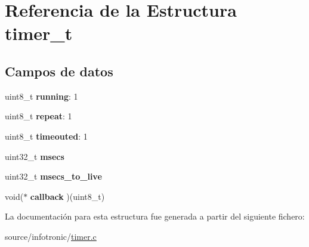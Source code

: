 \hypertarget{structtimer__t}{}\section{Referencia de la Estructura timer\+\_\+t}
\label{structtimer__t}
\subsection*{Campos de datos}
\begin{DoxyCompactItemize}
\item 
\mbox{\label{structtimer__t_a9624eaffed5cbcb6266f2207ddaac334}} 
uint8\+\_\+t {\bfseries running}\+: 1
\item 
\mbox{\label{structtimer__t_adf4cfba1c8d2514716d4f2b9090a9a88}} 
uint8\+\_\+t {\bfseries repeat}\+: 1
\item 
\mbox{\label{structtimer__t_a3235adab6714a02d8383ef9e0d5f5e6c}} 
uint8\+\_\+t {\bfseries timeouted}\+: 1
\item 
\mbox{\label{structtimer__t_ad50a9d39777312284d84d73cccb0fbf9}} 
uint32\+\_\+t {\bfseries msecs}
\item 
\mbox{\label{structtimer__t_aa4fd2c575bbe6e4f4b7e4534162ea9b0}} 
uint32\+\_\+t {\bfseries msecs\+\_\+to\+\_\+live}
\item 
\mbox{\label{structtimer__t_a97cc21c1fc027659274a29e4e4de0200}} 
void($\ast$ {\bfseries callback} )(uint8\+\_\+t)
\end{DoxyCompactItemize}


La documentación para esta estructura fue generada a partir del siguiente fichero\+:\begin{DoxyCompactItemize}
\item 
source/infotronic/\hyperlink{timer_8c}{timer.\+c}\end{DoxyCompactItemize}
